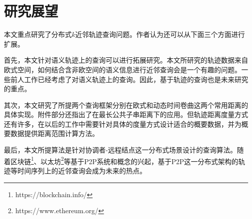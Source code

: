 \section{研究展望}
本文重点研究了分布式$k$近邻轨迹查询问题。作者认为还可以从下面三个方面进行扩展。

首先，本文针对语义轨迹上的查询可以进行拓展研究。本文所研究的轨迹数据来自欧式空间，如何结合含非欧空间的语义信息进行近邻查询会是一个有趣的问题。一些前人工作\cite{Xiao,Kaiser,WangBCSSQ17}已经考虑了对语义轨迹上的查询。因此，基于轨迹的查询也是未来研究的重点。
	
其次，本文研究了所提两个查询框架分别在欧式和动态时间卷曲这两个常用距离的具体实现。附件部分还指出了在最长公共子串距离下的应用。但轨迹距离度量方式还有许多，在以后的工作中需要针对具体的度量方式设计适合的概要数据，并为概要数据提供距离范围计算方法。

	
最后，本文所提算法是针对协调者-远程结点这一分布式场景设计的查询算法。随着区块链\footnote{https://blockchain.info/}、以太坊\footnote{https://www.ethereum.org/}等基于P2P系统和概念的兴起，基于P2P这一分布式架构的轨迹等时间序列上的近邻查询会成为未来的热点。
\clearpage
\phantom{s}
\clearpage